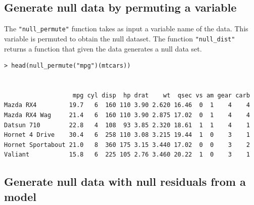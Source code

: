 \subsection{Generate null data by permuting a
variable}\label{generate-null-data-by-permuting-a-variable}

The \texttt{"null\_permute"} function takes as input a variable name of
the data. This variable is permuted to obtain the null dataset. The
function \texttt{"null\_dist"} returns a function that given the data
generates a null data set.

\begin{verbatim}
> head(null_permute("mpg")(mtcars))


                   mpg cyl disp  hp drat    wt  qsec vs am gear carb
Mazda RX4         19.7   6  160 110 3.90 2.620 16.46  0  1    4    4
Mazda RX4 Wag     21.4   6  160 110 3.90 2.875 17.02  0  1    4    4
Datsun 710        22.8   4  108  93 3.85 2.320 18.61  1  1    4    1
Hornet 4 Drive    30.4   6  258 110 3.08 3.215 19.44  1  0    3    1
Hornet Sportabout 21.0   8  360 175 3.15 3.440 17.02  0  0    3    2
Valiant           15.8   6  225 105 2.76 3.460 20.22  1  0    3    1
\end{verbatim}

%

\subsection{Generate null data with null residuals from a
model}\label{generate-null-data-with-null-residuals-from-a-model}

